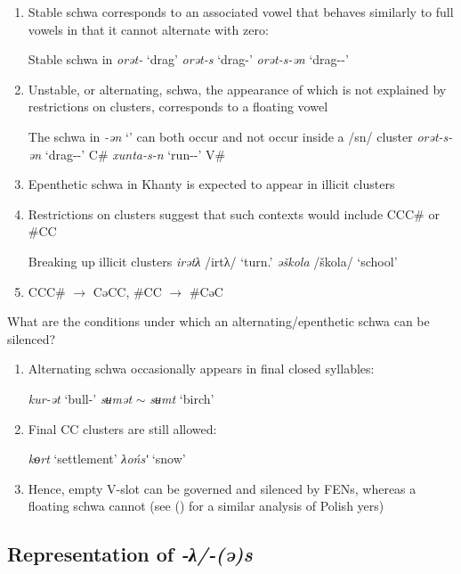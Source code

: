 \documentclass[a4paper, 12pt]{article}
\newcommand{\citeay}[2][]{
   \citeauthor{#2} (\citeyear[#1]{#2})}
\begin{document}
	\begin{enumerate}[$\gg$]
		\item Stable schwa corresponds to an associated vowel that behaves similarly to full vowels in that it cannot alternate with zero:
		
		\pex Stable schwa in \emph{orət-} `drag'
			\a \emph{orət-s} \hfill `drag-{\Pst}'
			\a \emph{orət-s-ən} \hfill `drag-{\Pst}-{\Fdu}' 
		\xe
		
		\item Unstable, or alternating, schwa, the appearance of which is not explained by restrictions on clusters, corresponds to a floating vowel
		
		\pex The schwa in \emph{-ən} `{\Ssg}' can both occur and not occur inside a /sn/ cluster
			\a \emph{orət-s-ən} `drag-{\Pst}-{\Fdu}' \hfill C\#
			\a \emph{xunta-s-n} `run-{\Pst}-{\Fdu}' \hfill V\#
		\xe
		
		\item Epenthetic schwa in Khanty is expected to appear in illicit clusters
		\item Restrictions on clusters suggest that such contexts would include CCC\# or \#CC
		
			\pex Breaking up illicit clusters
		\a \emph{irətλ} /irtλ/ \hfill `turn.{\Npst}'
		\a \emph{əškola} /škola/ \hfill `school'
			\xe
		\item CCC\# $\rightarrow$ CəCC, \#CC $\rightarrow$ \#CəC
	\end{enumerate}
	What are the conditions under which an alternating/epenthetic schwa can be silenced?
	
	\begin{enumerate}[$\gg$]
		\item Alternating schwa occasionally appears in final closed syllables:
		
	\pex 
		\a \emph{kur-ət} \hfill `bull-{\Pl}'
		\a \emph{sʉmət} $\sim$ \emph{sʉmt} \hfill `birch'
	\xe
		
		\item Final CC clusters are still allowed:
		
	\pex
		\a \emph{kөrt} \hfill `settlement'
		\a \emph{λo{\'n}sʹ} \hfill `snow'
	\xe
		
		\item Hence, empty V-slot can be governed and silenced by FENs, whereas a floating schwa cannot (see \citeay{scheer2012yers} for a similar analysis of Polish yers)
	\end{enumerate}

		\subsection{Representation of \emph{-λ/-(ə)s}}
		
\end{document}
